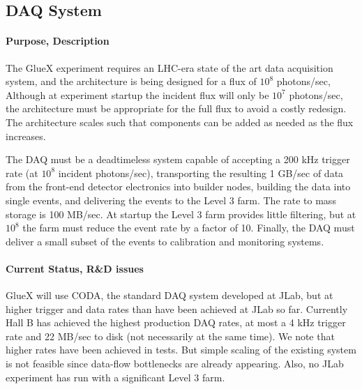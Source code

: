 \documentclass[11pt]{article}
\begin{document}

\subsection{DAQ System}



\paragraph{Purpose, Description}



The GlueX experiment requires an LHC-era state of the art data
acquisition system, and the architecture is being designed for a flux
of $10^8$ photons/sec, Although at experiment startup the incident
flux will only be $10^7$ photons/sec, the architecture must be
appropriate for the full flux to avoid a costly redesign.  The
architecture scales such that components can be added as needed as the
flux increases.



The DAQ must be a deadtimeless system capable of accepting a 200 kHz
trigger rate (at $10^8$ incident photons/sec), transporting the
resulting 1 GB/sec of data from the front-end detector electronics
into builder nodes, building the data into single events, and
delivering the events to the Level 3 farm.  The rate to mass storage
is 100 MB/sec.  At startup the Level 3 farm provides little filtering,
but at $10^8$ the farm must reduce the event rate by a factor of 10.
Finally, the DAQ must deliver a small subset of the events to
calibration and monitoring systems.







\paragraph{Current Status, R\&D issues}


GlueX will use CODA, the standard DAQ system developed at JLab, but at
higher trigger and data rates than have been achieved at JLab so far.
Currently Hall B has achieved the highest production DAQ rates, at
most a 4 kHz trigger rate and 22 MB/sec to disk (not necessarily at
the same time).  We note that higher rates have been achieved in
tests.  But simple scaling of the existing system is not feasible
since data-flow bottlenecks are already appearing.  Also, no JLab
experiment has run with a significant Level 3 farm.
\end{document}

